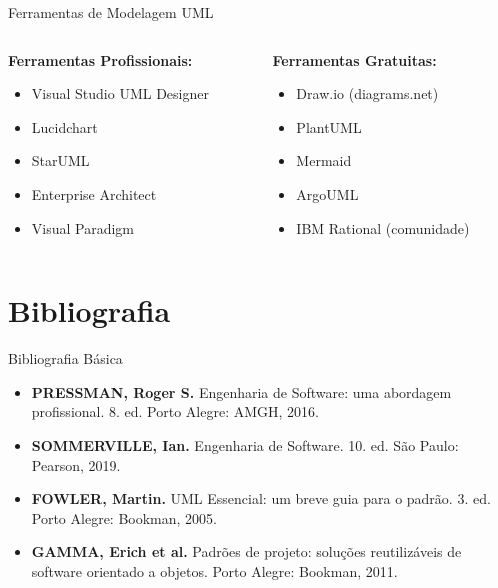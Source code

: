 \documentclass[aspectratio=169]{beamer}
\begin{document}
\begin{frame}{Ferramentas de Modelagem UML}
\begin{columns}
\begin{column}{0.5\textwidth}
\textbf{Ferramentas Profissionais:}
\begin{itemize}
    \item Visual Studio UML Designer
    \item Lucidchart
    \item StarUML
    \item Enterprise Architect
    \item Visual Paradigm
\end{itemize}
\end{column}
\begin{column}{0.5\textwidth}
\textbf{Ferramentas Gratuitas:}
\begin{itemize}
    \item Draw.io (diagrams.net)
    \item PlantUML
    \item Mermaid
    \item ArgoUML
    \item IBM Rational (comunidade)
\end{itemize}
\end{column}
\end{columns}
\end{frame}

\section{Bibliografia}

\begin{frame}{Bibliografia Básica}
\begin{itemize}
    \item \textbf{PRESSMAN, Roger S.} Engenharia de Software: uma abordagem profissional. 8. ed. Porto Alegre: AMGH, 2016.
    \item \textbf{SOMMERVILLE, Ian.} Engenharia de Software. 10. ed. São Paulo: Pearson, 2019.
    \item \textbf{FOWLER, Martin.} UML Essencial: um breve guia para o padrão. 3. ed. Porto Alegre: Bookman, 2005.
    \item \textbf{GAMMA, Erich et al.} Padrões de projeto: soluções reutilizáveis de software orientado a objetos. Porto Alegre: Bookman, 2011.
\end{itemize}
\end{frame}
\end{document}
